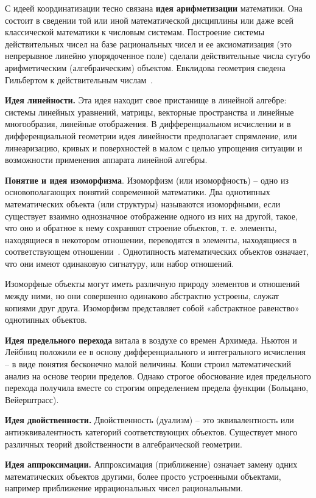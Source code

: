 С идеей координатизации тесно связана \textbf{идея арифметизации} математики. Она состоит в сведении той или иной математической дисциплины или даже всей классической математики к числовым системам. Построение системы действительных чисел на базе рациональных чисел и ее аксиоматизация (это непрерывное линейно упорядоченное поле) сделали действительные числа сугубо арифметическим (алгебраическим) объектом. Евклидова геометрия сведена Гильбертом к действительным числам~\cite{вечтомов2013философия}.

\textbf{Идея линейности.} Эта идея находит свое пристанище в линейной алгебре: системы линейных уравнений, матрицы, векторные пространства и линейные многообразия, линейные отображения. В дифференциальном исчислении и в дифференциальной геометрии идея линейности предполагает спрямление, или линеаризацию, кривых и поверхностей в малом с целью упрощения ситуации и возможности применения аппарата линейной алгебры.

\textbf{Понятие и идея изоморфизма}. Изоморфизм (или изоморфность) – одно из основополагающих понятий современной математики. Два однотипных математических объекта (или структуры) называются изоморфными, если существует взаимно однозначное отображение одного из них на другой, такое, что оно и обратное к нему сохраняют строение объектов, т. е. элементы, находящиеся в некотором отношении, переводятся в элементы, находящиеся в соответствующем отношении~\cite{макаридина2022изучение}. Однотипность математических объектов означает, что они имеют одинаковую сигнатуру, или набор отношений. 

Изоморфные объекты могут иметь различную природу элементов и отношений между ними, но они совершенно одинаково абстрактно устроены, служат копиями друг друга. Изоморфизм представляет собой «абстрактное равенство» однотипных объектов. 

\textbf{Идея предельного перехода} витала в воздухе со времен Архимеда. Ньютон и Лейбниц положили ее в основу дифференциального и интегрального исчисления – в виде понятия бесконечно малой величины. Коши строил математический анализ на основе теории пределов. Однако строгое обоснование идея предельного перехода получила вместе со строгим определением предела функции (Больцано, Вейерштрасс). 

\textbf{Идея двойственности.} Двойственность (дуализм) – это эквивалентность или антиэквивалентность категорий соответствующих объектов. Существует много различных теорий двойственности в алгебраической геометрии.

\textbf{Идея аппроксимации.} Аппроксимация (приближение) означает замену одних математических объектов другими, более просто устроенными объектами, например приближение иррациональных чисел рациональными.


